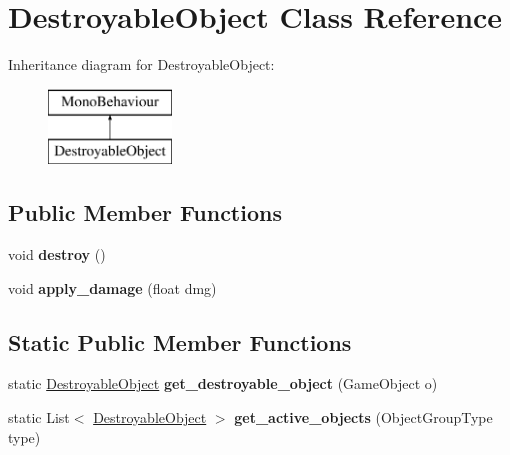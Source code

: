 \hypertarget{class_destroyable_object}{}\section{Destroyable\+Object Class Reference}
\label{class_destroyable_object}
Inheritance diagram for Destroyable\+Object\+:\begin{figure}[H]
\begin{center}
\leavevmode
\includegraphics[height=2.000000cm]{class_destroyable_object}
\end{center}
\end{figure}
\subsection*{Public Member Functions}
\begin{DoxyCompactItemize}
\item 
\mbox{\label{class_destroyable_object_a18522b00f4ba5ace130a27752cb842df}} 
void {\bfseries destroy} ()
\item 
\mbox{\label{class_destroyable_object_a17c15ce3f9d38fe25f62345ebff08966}} 
void {\bfseries apply\+\_\+damage} (float dmg)
\end{DoxyCompactItemize}
\subsection*{Static Public Member Functions}
\begin{DoxyCompactItemize}
\item 
\mbox{\label{class_destroyable_object_a876de137a9b1a1cb9c16ada789dc42e0}} 
static \hyperlink{class_destroyable_object}{Destroyable\+Object} {\bfseries get\+\_\+destroyable\+\_\+object} (Game\+Object o)
\item 
\mbox{\label{class_destroyable_object_ab37ab82ad45036e0d35e6ae6b4e18d97}} 
static List$<$ \hyperlink{class_destroyable_object}{Destroyable\+Object} $>$ {\bfseries get\+\_\+active\+\_\+objects} (Object\+Group\+Type type)
\end{DoxyCompactItemize}
